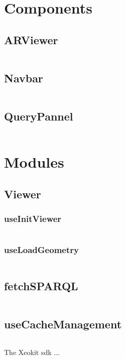 \section {Components}
\subsection{ARViewer}
\inputminted{tsx}{figures/snippets/src/components/ARViewer.tsx}
\newpage
\subsection{Navbar}
\inputminted{tsx}{figures/snippets/src/components/Navbar.tsx}
\newpage
\subsection{QueryPannel}
\inputminted{tsx}{figures/snippets/src/components/QueryPannel.tsx}

\newpage
\section {Modules}
\subsection{Viewer}
\subsubsection{useInitViewer}
\inputminted{ts}{figures/snippets/src/modules/viewer/useInitViewer.ts}
\newpage
\subsubsection{useLoadGeometry}
\inputminted{ts}{figures/snippets/src/modules/viewer/useLoadGeometry.ts}
\newpage
\subsection{fetchSPARQL}
\inputminted{ts}{figures/snippets/src/modules/fetchSPARQL.ts}
\newpage
\subsection{useCacheManagement}
\inputminted{ts}{figures/snippets/src/modules/useCacheManagement.ts}

The Xeokit \ac{sdk} ...